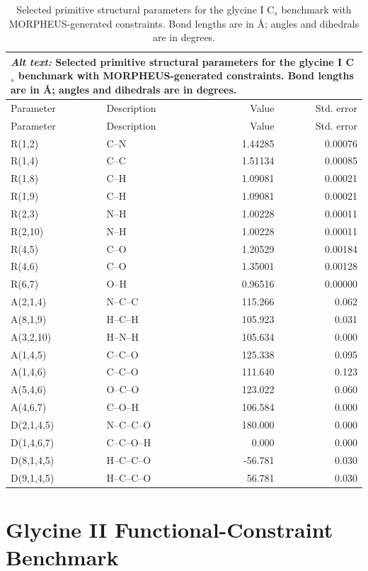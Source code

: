 \documentclass[12pt]{article}
\begin{document}
\begin{longtable}{llrr}
\caption{Selected primitive structural parameters for the glycine I C$_s$ benchmark with MORPHEUS-generated constraints. Bond lengths are in \AA; angles and dihedrals are in degrees.}\label{tab:si-glycine-I-geometry}\\
\multicolumn{4}{p{0.98\linewidth}}{\textit{Alt text:} Selected primitive structural parameters for the glycine I C$_s$ benchmark with MORPHEUS-generated constraints. Bond lengths are in \AA; angles and dihedrals are in degrees.}\\
\toprule
Parameter & Description & Value & Std. error \\
\midrule
\endfirsthead
\toprule
Parameter & Description & Value & Std. error \\
\midrule
\endhead
R(1,2) & C--N & 1.44285 & 0.00076 \\
R(1,4) & C--C & 1.51134 & 0.00085 \\
R(1,8) & C--H & 1.09081 & 0.00021 \\
R(1,9) & C--H & 1.09081 & 0.00021 \\
R(2,3) & N--H & 1.00228 & 0.00011 \\
R(2,10) & N--H & 1.00228 & 0.00011 \\
R(4,5) & C--O & 1.20529 & 0.00184 \\
R(4,6) & C--O & 1.35001 & 0.00128 \\
R(6,7) & O--H & 0.96516 & 0.00000 \\
A(2,1,4) & N--C--C & 115.266 & 0.062 \\
A(8,1,9) & H--C--H & 105.923 & 0.031 \\
A(3,2,10) & H--N--H & 105.634 & 0.000 \\
A(1,4,5) & C--C--O & 125.338 & 0.095 \\
A(1,4,6) & C--C--O & 111.640 & 0.123 \\
A(5,4,6) & O--C--O & 123.022 & 0.060 \\
A(4,6,7) & C--O--H & 106.584 & 0.000 \\
D(2,1,4,5) & N--C--C--O & 180.000 & 0.000 \\
D(1,4,6,7) & C--C--O--H & 0.000 & 0.000 \\
D(8,1,4,5) & H--C--C--O & -56.781 & 0.030 \\
D(9,1,4,5) & H--C--C--O & 56.781 & 0.030 \\
\bottomrule
\end{longtable}

\section{Glycine II Functional-Constraint Benchmark}
\end{document}
